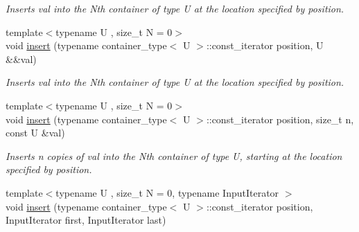 \begin{DoxyCompactItemize}
\begin{DoxyCompactList}\small\item\em Inserts val into the Nth container of type U at the location specified by position. \end{DoxyCompactList}\item 
\hypertarget{classheterogeneous_1_1heterovector_3_01_t_00_01_types_8_8_8_4_ad6cf66861b048603720f7ec85bad54bb}{}{\footnotesize template$<$typename U , size\+\_\+t N = 0$>$ }\\void \hyperlink{classheterogeneous_1_1heterovector_3_01_t_00_01_types_8_8_8_4_ad6cf66861b048603720f7ec85bad54bb}{insert} (typename container\+\_\+type$<$ U $>$\+::const\+\_\+iterator position, U \&\&val)\label{classheterogeneous_1_1heterovector_3_01_t_00_01_types_8_8_8_4_ad6cf66861b048603720f7ec85bad54bb}

\begin{DoxyCompactList}\small\item\em Inserts val into the Nth container of type U at the location specified by position. \end{DoxyCompactList}\item 
\hypertarget{classheterogeneous_1_1heterovector_3_01_t_00_01_types_8_8_8_4_a92810030e6cc54c3dde6dd760c0475ac}{}{\footnotesize template$<$typename U , size\+\_\+t N = 0$>$ }\\void \hyperlink{classheterogeneous_1_1heterovector_3_01_t_00_01_types_8_8_8_4_a92810030e6cc54c3dde6dd760c0475ac}{insert} (typename container\+\_\+type$<$ U $>$\+::const\+\_\+iterator position, size\+\_\+t n, const U \&val)\label{classheterogeneous_1_1heterovector_3_01_t_00_01_types_8_8_8_4_a92810030e6cc54c3dde6dd760c0475ac}

\begin{DoxyCompactList}\small\item\em Inserts n copies of val into the Nth container of type U, starting at the location specified by position. \end{DoxyCompactList}\item 
\hypertarget{classheterogeneous_1_1heterovector_3_01_t_00_01_types_8_8_8_4_ad397e3241f4a290e8b6b089708a14c7b}{}{\footnotesize template$<$typename U , size\+\_\+t N = 0, typename Input\+Iterator $>$ }\\void \hyperlink{classheterogeneous_1_1heterovector_3_01_t_00_01_types_8_8_8_4_ad397e3241f4a290e8b6b089708a14c7b}{insert} (typename container\+\_\+type$<$ U $>$\+::const\+\_\+iterator position, Input\+Iterator first, Input\+Iterator last)\label{classheterogeneous_1_1heterovector_3_01_t_00_01_types_8_8_8_4_ad397e3241f4a290e8b6b089708a14c7b}


\end{DoxyCompactItemize}
